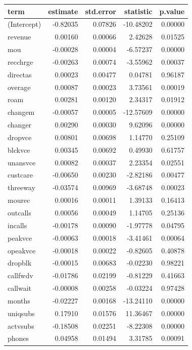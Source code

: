 \documentclass[
]{article}
\begin{document}
\begin{longtable}[]{@{}lrrrr@{}}
\toprule\noalign{}
term & estimate & std.error & statistic & p.value \\
\midrule\noalign{}
\endhead
\bottomrule\noalign{}
\endlastfoot
(Intercept) & -0.82035 & 0.07826 & -10.48202 & 0.00000 \\
revenue & 0.00160 & 0.00066 & 2.42628 & 0.01525 \\
mou & -0.00028 & 0.00004 & -6.57237 & 0.00000 \\
recchrge & -0.00263 & 0.00074 & -3.55962 & 0.00037 \\
directas & 0.00023 & 0.00477 & 0.04781 & 0.96187 \\
overage & 0.00087 & 0.00023 & 3.73561 & 0.00019 \\
roam & 0.00281 & 0.00120 & 2.34317 & 0.01912 \\
changem & -0.00057 & 0.00005 & -12.57609 & 0.00000 \\
changer & 0.00290 & 0.00030 & 9.62096 & 0.00000 \\
dropvce & 0.00801 & 0.00698 & 1.14770 & 0.25109 \\
blckvce & 0.00345 & 0.00692 & 0.49930 & 0.61757 \\
unansvce & 0.00082 & 0.00037 & 2.23354 & 0.02551 \\
custcare & -0.00650 & 0.00230 & -2.82186 & 0.00477 \\
threeway & -0.03574 & 0.00969 & -3.68748 & 0.00023 \\
mourec & 0.00016 & 0.00011 & 1.39133 & 0.16413 \\
outcalls & 0.00056 & 0.00049 & 1.14705 & 0.25136 \\
incalls & -0.00178 & 0.00090 & -1.97778 & 0.04795 \\
peakvce & -0.00063 & 0.00018 & -3.41461 & 0.00064 \\
opeakvce & -0.00018 & 0.00022 & -0.82605 & 0.40878 \\
dropblk & -0.00015 & 0.00683 & -0.02230 & 0.98221 \\
callfwdv & -0.01786 & 0.02199 & -0.81229 & 0.41663 \\
callwait & -0.00008 & 0.00258 & -0.03224 & 0.97428 \\
months & -0.02227 & 0.00168 & -13.24110 & 0.00000 \\
uniqsubs & 0.17910 & 0.01576 & 11.36467 & 0.00000 \\
actvsubs & -0.18508 & 0.02251 & -8.22308 & 0.00000 \\
phones & 0.04958 & 0.01494 & 3.31785 & 0.00091 \\

\end{longtable}
\end{document}
